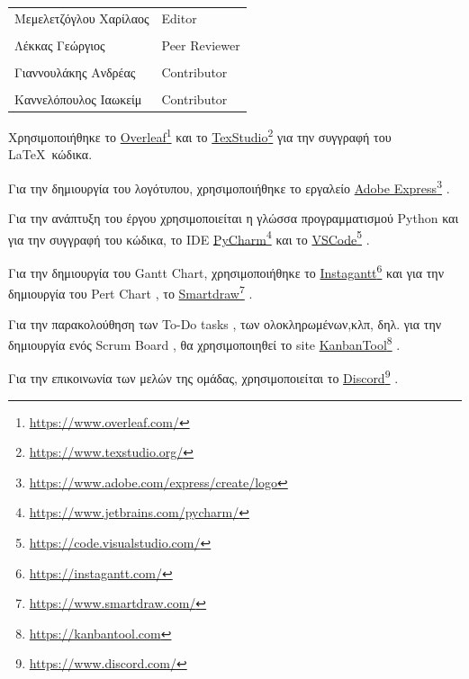 \documentclass{../ol-softwaremanual}
\newcommand{\doclink}[2]{\href{#1}{#2}\footnote{\url{#1}}}
\begin{document}
	
	\vspace{20pt}
	
	\begin{table}[htbp!]
		\begin{tabular}{ll}
			Μεμελετζόγλου Χαρίλαος & \en Editor \\
			\\ Λέκκας Γεώργιος      &   \en  Peer Reviewer \\
			\\ Γιαννουλάκης Ανδρέας & \en Contributor \\
			\\ Καννελόπουλος Ιαωκείμ & \en Contributor \\ 
		\end{tabular}
	\end{table}
	
	
	\vspace{20pt}
	
	
	\vspace{20pt}
	\flushleft
	Χρησιμοποιήθηκε το \en \doclink{https://www.overleaf.com/}{Overleaf} \gr και το \en \doclink{https://www.texstudio.org/}{TexStudio} \gr για την συγγραφή του \LaTeX\ κώδικα. \break
	
	Για την δημιουργία του λογότυπου, χρησιμοποιήθηκε το εργαλείο \en \doclink{https://www.adobe.com/express/create/logo}{Adobe Express} . \gr \break
	
	Για την ανάπτυξη του έργου χρησιμοποιείται η γλώσσα προγραμματισμού \en Python \gr και για την συγγραφή του κώδικα, το \en IDE \doclink{https://www.jetbrains.com/pycharm/}{PyCharm} \gr και το \en \doclink{https://code.visualstudio.com/}{VSCode} \gr .         \\ \break
	
	Για την δημιουργία του \en Gantt Chart, \gr χρησιμοποιήθηκε το \en \doclink{https://instagantt.com/}{Instagantt}  \gr και για την δημιουργία του \en Pert Chart \gr, το \en \doclink{https://www.smartdraw.com/}{Smartdraw} \gr. \break
	
	Για την παρακολούθηση των \en To-Do tasks \gr, των ολοκληρωμένων,κλπ, δηλ. για την δημιουργία ενός \en Scrum Board \gr, θα χρησιμοποιηθεί το \en site \doclink{https://kanbantool.com}{KanbanTool} \gr. \break 
	
	Για την επικοινωνία των μελών της ομάδας, χρησιμοποιείται το \en \doclink{ https://www.discord.com/}{Discord} \gr . \linebreak 
	
\end{document}
